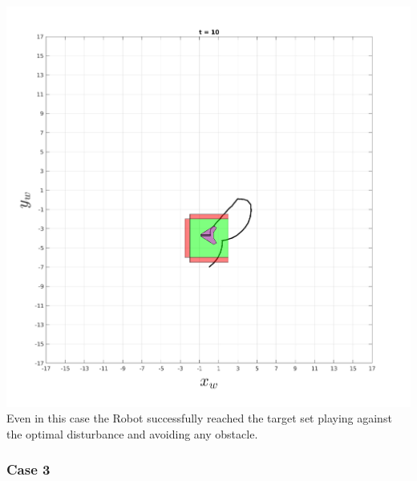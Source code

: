     \includegraphics[scale=0.25]{figures/dynamicTRAJ4.png}
    \\
    Even in this case the Robot successfully reached the target set playing against the optimal disturbance and avoiding any obstacle.
    
    \subsubsection{Case 3}
        
